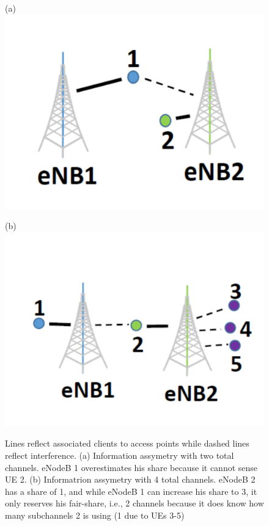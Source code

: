 \begin{figure}[htb!]
\vspace{-10pt}
  \begin{minipage}{0.20\textwidth}
    \centering
    (a)
    \vfill
    \includegraphics[width=\textwidth,height=0.5\columnwidth]{./figs/over.pdf}
  \end{minipage}
  \begin{minipage}{0.20\textwidth}
    \centering
    (b)
    \vfill
  \includegraphics[width=\textwidth,height=0.5\columnwidth]{./figs/under.pdf}
  \end{minipage}
  \hfill
  \caption{\small{Lines reflect associated clients to access points while dashed lines reflect interference. (a) Information assymetry with two total channels. eNodeB 1 overestimates his share because it cannot sense UE 2. (b) Informatrion assymetry with 4 total channels. eNodeB 2 has a
share of 1, and while eNodeB 1 can increase his share to 3, it only reserves his fair-share, i.e., 2
channels because it does know how many subchannels 2 is using (1 due to UEs 3-5)}}
  \label{fig:asym}
\vspace{-15pt}

\end{figure}


